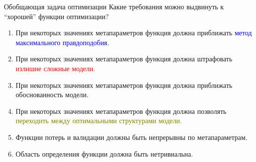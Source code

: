 \documentclass[10pt,pdf,utf8,russian,aspectratio=169]{beamer}
\begin{document}
\begin{frame}{Обобщающая задача оптимизации}
Какие требования можно выдвинуть к ``хорошей'' функции оптимизации?
\begin{enumerate}
\item При некоторых значениях метапараметров функция должна приближать \textcolor{blue}{метод максимального правдоподобия}.
\item При некоторых значениях метапараметров функция должна штрафовать \textcolor{red}{излишне сложные модели.}
\item При некоторых значениях метапараметров функция должна приближать обоснованность модели.
\item При некоторых значениях метапараметров функция должна позволять \textcolor{olive}{переходить между оптимальными структурами модели.}
\item Функции потерь и валидации должны быть непрерывны по метапараметрам.
\item Область определения функции должна быть нетривиальна.
\end{enumerate}
\end{frame}
\end{document}
